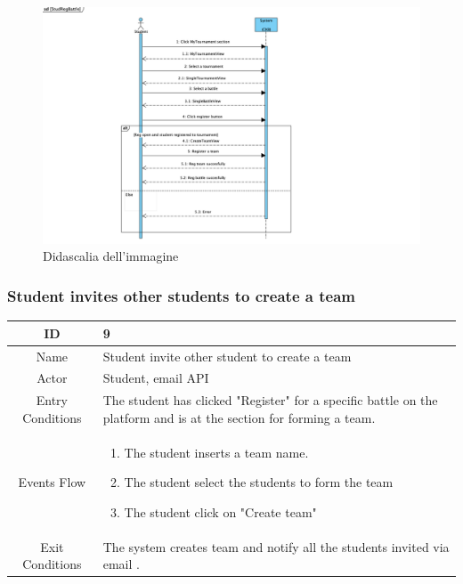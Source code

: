     \begin{figure}[H]
  \includegraphics[width=1\linewidth]{SequenceDiagram/StudRegBattle.png} 
  \caption{Didascalia dell'immagine}
  \label{fig:immagine}
\end{figure}

\subsubsection{Student invites other students to create a team}
\begin{longtable}{|c| p{10cm}|}
        \hline
            ID & 9 \\
        \hline
            Name & Student invite other student to create a team  \\
        \hline
            Actor & Student, email API \\
        \hline
            Entry Conditions & 

                                 The student has clicked "Register" for a specific battle on the platform and is at the section for  forming a team.
\\
        \hline
            Events Flow &   \begin{enumerate}
            
                                \item The student inserts a team name.
                                \item The student select the students  to form the team 
                                \item  The student click on "Create team"
                                
                            \end{enumerate} \\
        \hline
            Exit Conditions &
            The system creates team and notify all the students invited via email . 
\\
        \hline
    \end{longtable}

